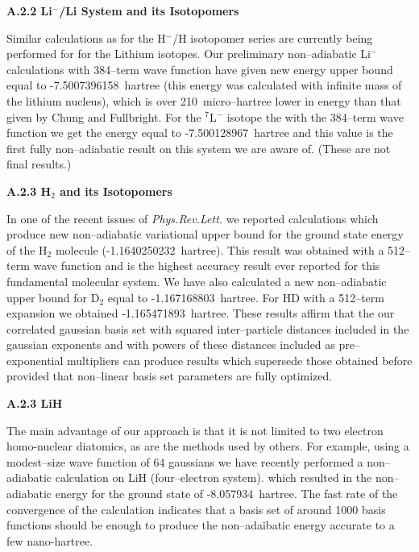 \vspace{2mm}
{\bf A.2.2 Li$^-$/Li System and its Isotopomers} 


Similar calculations as for the H$^-$/H isotopomer series
are currently being performed for  
for the Lithium isotopes.
Our preliminary non--adiabatic 
Li$^-$ calculations 
with 384--term wave function
have given new energy upper bound equal to
-7.5007396158~hartree (this energy was calculated
with infinite mass of the lithium nucleus), which is
over 210~micro--hartree lower in energy than that
given by Chung and Fullbright.\cite{Chung92} 
For the $^7$L$^-$ isotope the with the 384--term wave function
we get the energy equal to -7.500128967~hartree and this value 
is the first fully non--adiabatic result on this system we 
are aware of. (These are not final results.)


\vspace{2mm}
{\bf A.2.3 H$_2$ and its Isotopomers}

In one of the recent issues of {\em Phys.Rev.Lett.}\cite{ad1} 
we reported calculations which produce new non--adiabatic
variational upper bound for the ground state energy of
the H$_2$ molecule (-1.1640250232~hartree). This result
was obtained with a 512--term wave function and is the highest
accuracy result ever reported for this fundamental molecular system.
We have also calculated a new non--adiabatic upper bound
for D$_2$ equal to  -1.167168803~hartree.
For HD with a 512--term expansion we obtained -1.165471893~hartree.
These results affirm that the our correlated gaussian
basis set with squared inter--particle distances included in the
gaussian exponents and with powers of these distances included
as pre--exponential multipliers can produce results 
which supersede those obtained before provided that 
non--linear basis set parameters are fully optimized.

 
\vspace{2mm}
{\bf A.2.3 LiH}

The main advantage of our approach is that it is not
limited to two electron homo-nuclear diatomics, as are the
methods used by others. For example, using a modest--size
wave function of 64 gaussians we have recently performed
a non--adiabatic calculation on LiH (four--electron system).
which resulted in the non--adiabatic energy for the 
ground state of -8.057934~hartree.
The fast rate of the convergence of the calculation
indicates that a basis set of around 1000 basis functions
should be enough to produce the non--adaibatic energy
accurate to a few nano-hartree. 


